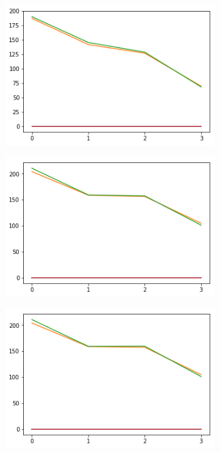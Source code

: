 \begin{figure}[h!]
  \begin{subfigure}[b]{0.3\linewidth}
    \includegraphics[width=\linewidth]{images/subst2/ef0_means_pos.png}
    \caption{}
  \end{subfigure}
  \begin{subfigure}[b]{0.3\linewidth}
    \includegraphics[width=\linewidth]{images/subst2/ef1_means_pos.png}
    \caption{}
  \end{subfigure}
  \begin{subfigure}[b]{0.3\linewidth}
    \includegraphics[width=\linewidth]{images/subst2/ef2_means_pos.png}

\end{subfigure}
\end{figure}
